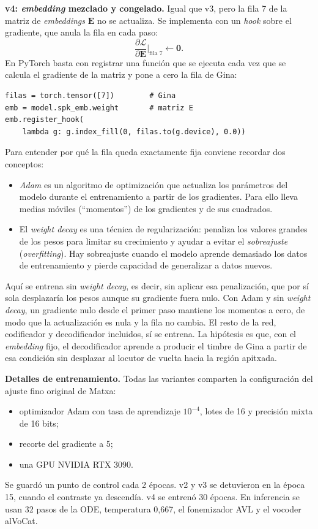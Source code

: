 \documentclass[conference]{IEEEtran}
\begin{document}
\textbf{v4: \textit{embedding} mezclado y congelado.} Igual que v3, pero la fila 7 de la matriz de \textit{embeddings} $\mathbf{E}$ no se actualiza. Se implementa con un \textit{hook} sobre el gradiente, que anula la fila en cada paso:
\begin{equation}
\frac{\partial \mathcal{L}}{\partial \mathbf{E}}\bigg|_{\text{fila }7} \leftarrow \mathbf{0}.
\end{equation}
En PyTorch basta con registrar una función que se ejecuta cada vez que se calcula el gradiente de la matriz y pone a cero la fila de Gina:
\begin{lstlisting}
filas = torch.tensor([7])        # Gina
emb = model.spk_emb.weight       # matriz E
emb.register_hook(
    lambda g: g.index_fill(0, filas.to(g.device), 0.0))
\end{lstlisting}
Para entender por qué la fila queda exactamente fija conviene recordar dos conceptos:
\begin{itemize}
\item \emph{Adam} es un algoritmo de optimización que actualiza los parámetros del modelo durante el entrenamiento a partir de los gradientes. Para ello lleva medias móviles (``momentos'') de los gradientes y de sus cuadrados.
\item El \emph{weight decay} es una técnica de regularización: penaliza los valores grandes de los pesos para limitar su crecimiento y ayudar a evitar el \emph{sobreajuste} (\textit{overfitting}). Hay sobreajuste cuando el modelo aprende demasiado los datos de entrenamiento y pierde capacidad de generalizar a datos nuevos.
\end{itemize}
Aquí se entrena sin \textit{weight decay}, es decir, sin aplicar esa penalización, que por sí sola desplazaría los pesos aunque su gradiente fuera nulo. Con Adam y sin \textit{weight decay}, un gradiente nulo desde el primer paso mantiene los momentos a cero, de modo que la actualización es nula y la fila no cambia. El resto de la red, codificador y decodificador incluidos, sí se entrena. La hipótesis es que, con el \textit{embedding} fijo, el decodificador aprende a producir el timbre de Gina a partir de esa condición sin desplazar al locutor de vuelta hacia la región apitxada.

\textbf{Detalles de entrenamiento.} Todas las variantes comparten la configuración del ajuste fino original de Matxa:
\begin{itemize}
\item optimizador Adam con tasa de aprendizaje $10^{-4}$, lotes de 16 y precisión mixta de 16 bits;
\item recorte del gradiente a 5;
\item una GPU NVIDIA RTX 3090.
\end{itemize}
Se guardó un punto de control cada 2 épocas. v2 y v3 se detuvieron en la época 15, cuando el contraste ya descendía. v4 se entrenó 30 épocas. En inferencia se usan 32 pasos de la ODE, temperatura 0,667, el fonemizador AVL y el vocoder alVoCat.
\end{document}

